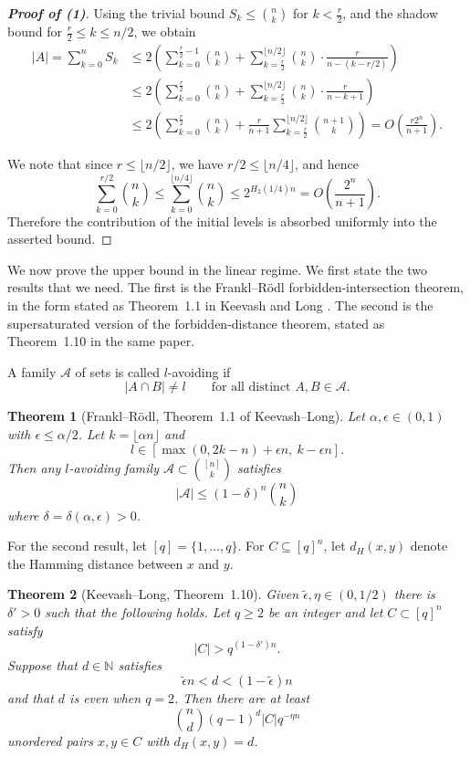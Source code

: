 \documentclass[11pt]{article}
\theoremstyle{plain}
\newtheorem{theorem}{Theorem}
\begin{document}
\begin{proof}[\textbf{Proof of (1)}]
Using the trivial bound $S_k\le \binom{n}{k}$ for $k<\frac r2$, and the
shadow bound for $\frac r2\le k\le n/2$, we obtain
\begin{align*}
|A|
=\sum_{k=0}^n S_k
&\le
2\left(\sum_{k=0}^{\frac r2-1}\binom{n}{k}
+\sum_{k=\frac r2}^{\lfloor n/2 \rfloor}\binom{n}{k}\cdot\frac{r}{n-(k-r/2)}\right)\\
&\le
2\left(\sum_{k=0}^{\frac r2}\binom{n}{k}
+\sum_{k=\frac r2}^{\lfloor n/2 \rfloor }\binom{n}{k}\cdot\frac{r}{n-k+1}\right)\\
&\le
2\left(\sum_{k=0}^{\frac r2}\binom{n}{k}
+\frac{r}{n+1}\sum_{k=\frac r2}^{\lfloor n/2 \rfloor }\binom{n+1}{k}\right)=O\!\left(\frac{r2^n}{n+1}\right).
\end{align*}

We note that since $r\le \lfloor n/2 \rfloor$, we have $r/2\le \lfloor n/4 \rfloor$, and hence
\[
\sum_{k=0}^{r/2}\binom{n}{k}
\le
\sum_{k=0}^{\lfloor n/4\rfloor}\binom{n}{k}
\le
2^{H_2(1/4)n}
=
O\!\left(\frac{2^n}{n+1}\right).
\]
Therefore the contribution of the initial levels is absorbed
uniformly into the asserted bound.

\end{proof}

We now prove the upper bound in the linear regime.
We first state the two results that we need.
The first is the Frankl--R\"odl forbidden-intersection theorem, in the form stated as Theorem~1.1 in Keevash and Long \cite{KeevashLong}.
The second is the supersaturated version of the forbidden-distance theorem, stated as Theorem~1.10 in the same paper.

A family $\mathcal A$ of sets is called $l$-avoiding if
\[
|A\cap B|\ne l
\qquad\text{for all distinct }A,B\in\mathcal A.
\]

\begin{theorem}[Frankl--R\"odl, Theorem~1.1 of Keevash--Long]\label{thm:KL-FR}
Let $\alpha,\epsilon\in(0,1)$ with $\epsilon\le \alpha/2$.
Let $k=\lfloor \alpha n\rfloor$ and
\[
l\in [\max(0,2k-n)+\epsilon n,\ k-\epsilon n].
\]
Then any $l$-avoiding family $\mathcal A\subset \binom{[n]}{k}$ satisfies
\[
|\mathcal A|\le (1-\delta)^n\binom{n}{k}
\]
where $\delta=\delta(\alpha,\epsilon)>0$.
\end{theorem}

For the second result, let $[q]=\{1,\ldots,q\}$.
For $C\subseteq [q]^n$, let $d_H(x,y)$ denote the Hamming distance between $x$ and $y$.

\begin{theorem}[Keevash--Long, Theorem~1.10]\label{thm:KL-supersat}
Given $\tilde\epsilon,\eta\in(0,1/2)$ there is $\delta'>0$ such that the following holds.
Let $q\ge 2$ be an integer and let $C\subset [q]^n$ satisfy 
\[
|C|>q^{(1-\delta')n}.
\]
Suppose that $d\in\mathbb N$ satisfies
\[
\tilde\epsilon n<d<(1-\tilde\epsilon)n
\]
and that $d$ is even when $q=2$.
Then there are at least
\[
\binom{n}{d}(q-1)^d |C|q^{-\eta n}
\]
unordered pairs $x,y\in C$ with $d_H(x,y)=d$.
\end{theorem}
\end{document}
